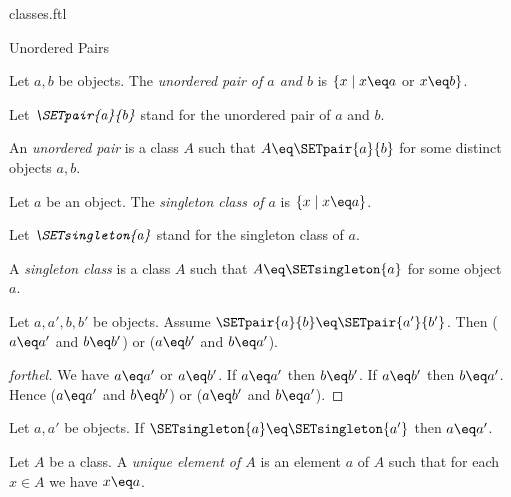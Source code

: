 \documentclass{naproche-library}
\begin{document}
\begin{smodule}[title=Classes]{classes.ftl}
\begin{sfragment}{Unordered Pairs}
  \begin{definition}[forthel,id=FOUNDATIONS_01_3471035364016128]
    Let $a, b$ be objects.
    The \emph{unordered pair of $a$ and $b$} is $\{ x \mid x \eq a$ or $x \eq b \}$.

    Let $\emph{\SETpair{a}{b}}$ stand for the unordered pair of $a$ and $b$.
  \end{definition}

  \begin{definition}[forthel,id=FOUNDATIONS_01_605432672419840]
    An \emph{unordered pair} is a class $A$ such that $A \eq \SETpair{a}{b}$ for some distinct objects $a, b$.
  \end{definition}

  \begin{definition}[forthel,id=FOUNDATIONS_01_1160414603771904]
    Let $a$ be an object.
    The \emph{singleton class of $a$} is $\{ x \mid x \eq a \}$.

    Let $\emph{\SETsingleton{a}}$ stand for the singleton class of $a$.
  \end{definition}

  \begin{definition}[forthel,id=FOUNDATIONS_01_6786618161627136]
    A \emph{singleton class} is a class $A$ such that $A \eq \SETsingleton{a}$ for some object $a$.
  \end{definition}

  \begin{proposition}[forthel,id=FOUNDATIONS_01_6125259604361216]
    Let $a, a', b, b'$ be objects.
    Assume $\SETpair{a}{b} \eq \SETpair{a'}{b'}$.
    Then ($a \eq a'$ and $b \eq b'$) or ($a \eq b'$ and $b \eq a'$).
  \end{proposition}
  \begin{proof}[forthel]
    We have $a \eq a'$ or $a \eq b'$.
    If $a \eq a'$ then $b \eq b'$.
    If $a \eq b'$ then $b \eq a'$.
    Hence ($a \eq a'$ and $b \eq b'$) or ($a \eq b'$ and $b \eq a'$).
  \end{proof}

  \begin{corollary}[forthel,id=FOUNDATIONS_01_6954678910713856]
    Let $a, a'$ be objects.
    If $\SETsingleton{a} \eq \SETsingleton{a'}$ then $a \eq a'$.
  \end{corollary}

  \begin{definition}[forthel,id=FOUNDATIONS_01_29867480293464351]
    Let $A$ be a class.
    A \emph{unique element of $A$} is an element $a$ of $A$ such that for each $x \in A$ we have $x \eq a$.
  \end{definition}


\end{sfragment}
\end{smodule}
\end{document}
